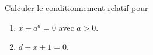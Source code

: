 
\begin{exercice}\label{exoSerieUn0007}

Calculer le conditionnement relatif pour
\begin{enumerate}
	\item $x-a^d=0$ avec $a>0.$
	\item $d-x+1=0$.
\end{enumerate}

\end{exercice}

